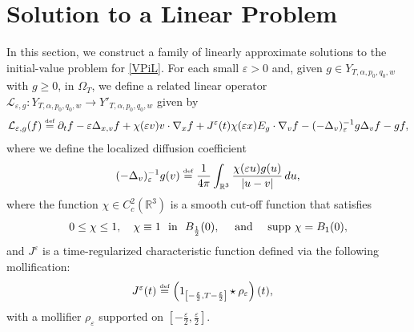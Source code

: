 \documentclass[reqno,11pt,final]{amsart}
\theoremstyle{plain}
\numberwithin{equation}{section}
\numberwithin{theorem}{section}
\newcommand{\eqdef }{\overset{\mbox{\tiny{def}}}{=}}
\begin{document}
\section{Solution to a Linear Problem}
\label{Construction of a sequence}
In this section, we construct a family of linearly approximate solutions to the initial-value problem for \eqref{VPiL}. For each small $\varepsilon>0$ and, given $g\in Y_{T,\alpha,p_0,q_0,w}$ with $g\ge0$, in $\Omega_T$, we define a related linear operator $\mathcal{L}_{\varepsilon,g}: Y_{T,\alpha,p_0,q_0,w}\rightarrow Y'_{T,\alpha,p_0,q_0,w}$ given by
\begin{align}\label{def.Leg}
\mathcal{L}_{\varepsilon,g}(f) \eqdef  \partial_t f - \varepsilon \Delta_{x,v}f + \chi(\varepsilon v)v\cdot\nabla_x f + J^{\varepsilon}(t)\chi(\varepsilon x) E_g\cdot\nabla_v f - (-\Delta_v)_\varepsilon^{-1}g \Delta_vf - gf,
\end{align}where we define the localized diffusion coefficient
\begin{align*}
    (-\Delta_v)^{-1}_\varepsilon g(v) \eqdef \frac{1}{4\pi}\int_{\mathbb{R}^3} \frac{\chi(\varepsilon u)g(u)}{|u-v|}\,du,
\end{align*}where the function $\chi\in C_c^2(\mathbb{R}^3)$ is a smooth cut-off function that satisfies
\begin{align}\label{def cutoff}
0\le \chi\le 1,\quad \chi\equiv1\,\,\textup{ in }\,\,B_{\frac{1}{2}}(0), \quad \textup{ and }\quad \textup{supp }\chi=B_1(0),
\end{align} and $J^\varepsilon$ is a time-regularized characteristic function defined via the following mollification:
\begin{align}\label{reg interval}
J^\varepsilon(t) &\eqdef \left(1_{\left[-\frac{\varepsilon}{2},T-\frac{\varepsilon}{2}\right]}\star \rho_\varepsilon\right)(t),
\end{align}with a mollifier $\rho_\varepsilon$ supported on $\left[-\frac{\varepsilon}{2}, \frac{\varepsilon}{2}\right]$.
\end{document}
